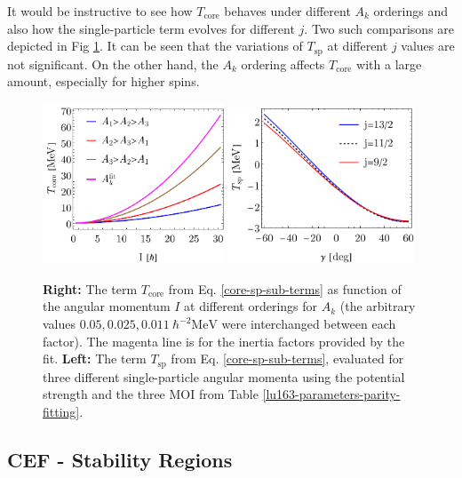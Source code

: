 It would be instructive to see how $T_\text{core}$ behaves under different $A_k$ orderings and also how the single-particle term evolves for different $j$. Two such comparisons are depicted in Fig \ref{fig-t-core-sp-terms}. It can be seen that the variations of $T_\text{sp}$ at different $j$ values are not significant. On the other hand, the $A_k$ ordering affects $T_\text{core}$ with a large amount, especially for higher spins.
\begin{figure}
    \centering
    \includegraphics[width=0.48\textwidth]{Chapters/Figures/parity-partners-plots/t-core.pdf}
    \includegraphics[width=0.495\textwidth]{Chapters/Figures/parity-partners-plots/t-sp.pdf}
    \caption{\textbf{Right:} The term $T_\text{core}$ from Eq. \ref{core-sp-sub-terms} as function of the angular momentum $I$ at different orderings for $A_k$ (the arbitrary values $0.05, 0.025, 0.011\ \hbar^{-2}\text{MeV}$ were interchanged between each factor). The magenta line is for the inertia factors provided by the fit. \textbf{Left:} The term $T_\text{sp}$ from Eq. \ref{core-sp-sub-terms}, evaluated for three different single-particle angular momenta using the potential strength and the three MOI from Table \ref{lu163-parameters-parity-fitting}.}
    \label{fig-t-core-sp-terms}
\end{figure}

\subsection{CEF - Stability Regions}

